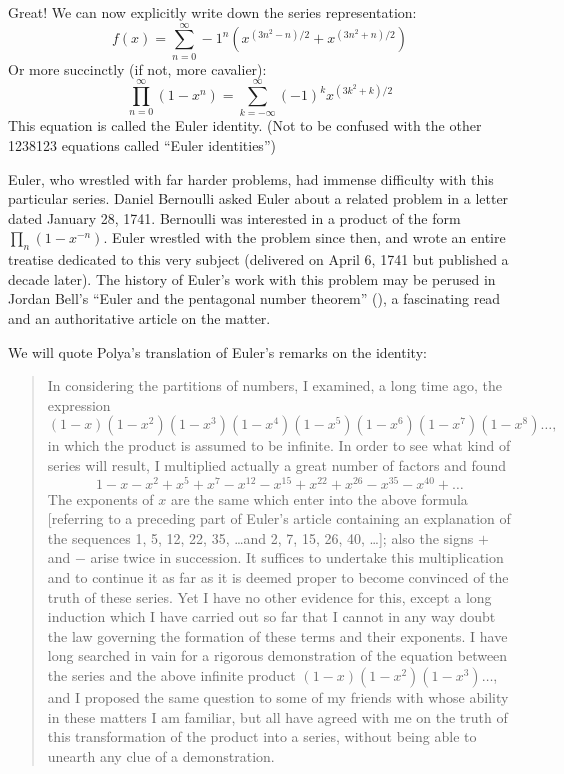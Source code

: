 \documentclass{article}
\begin{document}
Great! We can now explicitly write down the series representation:
\begin{equation}
f(x) = \sum^{\infty}_{n=0} -1^{n}(x^{(3n^{2}-n)/2} + x^{(3n^{2}+n)/2})
\end{equation}
Or more succinctly (if not, more cavalier):
\begin{equation}
\prod^{\infty}_{n=0}(1-x^{n}) = \sum^{\infty}_{k=-\infty}(-1)^{k}x^{(3k^{2}+k)/2}
\end{equation}
This equation is called the Euler identity. (Not to be confused with the
other 1238123 equations called ``Euler identities'')

\M
Euler, who wrestled with far harder problems, had immense difficulty
with this particular series. Daniel Bernoulli asked Euler about a
related problem in a letter dated January 28, 1741. Bernoulli was
interested in a product of the form $\prod_{n}(1-x^{-n})$. Euler
wrestled with the problem since then, and wrote an entire treatise
dedicated to this very subject (delivered on April 6, 1741 but published
a decade later). The history of Euler's work with this problem may be
perused in Jordan Bell's ``Euler and the pentagonal number theorem''
(), a fascinating read and an authoritative
article on the matter. 

We will quote Polya's translation of Euler's remarks on the identity:

\begin{quote}
In considering the partitions of numbers, I examined, a long time ago,
the expression
\begin{equation*}
 (1 - x)(1 - x^2 )(1 - x^3 )(1 - x^4 )(1 - x^5 )(1 - x^6 )(1 - x^7 )(1 - x^8 ) \dots , 
\end{equation*}
in which the product is assumed to be infinite. In order to see what
kind of series will result, I multiplied actually a great number of
factors and found
\begin{equation*}
 1 - x - x^2 + x^5 + x^7 - x^{12} - x^{15} + x^{22} + x^{26} - x^{35} - x^{40} + \dots 
\end{equation*}
The exponents of $x$ are the same which enter into the above formula
[referring to a preceding part of Euler's article containing an
  explanation of the sequences 1, 5, 12, 22, 35, \dots and 2, 7, 15, 26,
  40, \dots]; also the signs $+$ and $-$ arise twice in succession. It
suffices to undertake this multiplication and to continue it as far as
it is deemed proper to become convinced of the truth of these
series. Yet I have no other evidence for this, except a long induction
which I have carried out so far that I cannot in any way doubt the law
governing the formation of these terms and their exponents. I have long
searched in vain for a rigorous demonstration of the equation between
the series and the above infinite product $(1 - x)(1 - x^2 )(1 - x^3
)\dots$, and I proposed the same question to some of my friends with
whose ability in these matters I am familiar, but all have agreed with
me on the truth of this transformation of the product into a series,
without being able to unearth any clue of a demonstration.
\end{quote}
\end{document}
